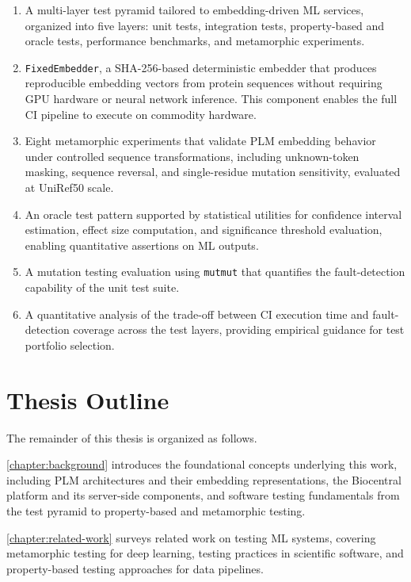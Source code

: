 \begin{enumerate}
  \item A multi-layer test pyramid tailored to embedding-driven \ac{ML} services, organized into five layers: unit tests, integration tests, property-based and oracle tests, performance benchmarks, and metamorphic experiments.
  \item \texttt{FixedEmbedder}, a SHA-256-based deterministic embedder that produces reproducible embedding vectors from protein sequences without requiring \ac{GPU} hardware or neural network inference. This component enables the full \ac{CI} pipeline to execute on commodity hardware.
  \item Eight metamorphic experiments that validate \ac{PLM} embedding behavior under controlled sequence transformations, including unknown-token masking, sequence reversal, and single-residue mutation sensitivity, evaluated at UniRef50 scale.
  \item An oracle test pattern supported by statistical utilities for confidence interval estimation, effect size computation, and significance threshold evaluation, enabling quantitative assertions on \ac{ML} outputs.
  \item A mutation testing evaluation using \texttt{mutmut} that quantifies the fault-detection capability of the unit test suite.
  \item A quantitative analysis of the trade-off between \ac{CI} execution time and fault-detection coverage across the test layers, providing empirical guidance for test portfolio selection.
\end{enumerate}

\section{Thesis Outline}\label{sec:outline}

The remainder of this thesis is organized as follows.

\autoref{chapter:background} introduces the foundational concepts underlying this work, including \ac{PLM} architectures and their embedding representations, the Biocentral platform and its server-side components, and software testing fundamentals from the test pyramid to property-based and metamorphic testing.

\autoref{chapter:related-work} surveys related work on testing \ac{ML} systems, covering metamorphic testing for deep learning, testing practices in scientific software, and property-based testing approaches for data pipelines.

